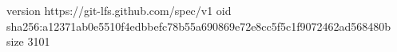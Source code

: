 version https://git-lfs.github.com/spec/v1
oid sha256:a12371ab0e5510f4edbbefc78b55a690869e72e8cc5f5c1f9072462ad568480b
size 3101
